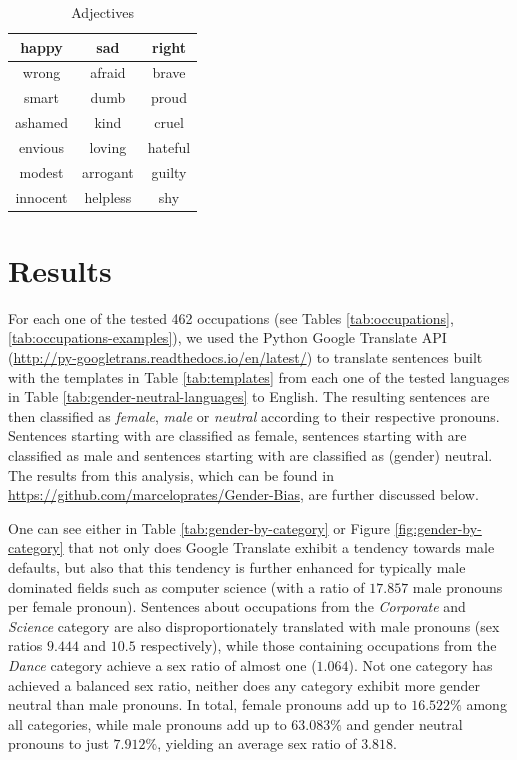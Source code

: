 \documentclass{article}
\begin{document}
\begin{table}[H]
	\centering
	\begin{tabular}{|c|c|c|}
	\hline
	happy 		& sad 		& right 	\\ \hline
	wrong 		& afraid	& brave 	\\ \hline
	smart		& dumb		& proud 	\\ \hline
	ashamed		& kind		& cruel 	\\ \hline
	envious		& loving	& hateful 	\\ \hline
	modest 		& arrogant	& guilty	\\ \hline
	innocent	& helpless	& shy		\\ \hline
	\end{tabular}
	\caption{Adjectives}
	\label{tab:adjectives}
\end{table}

\section{Results}

For each one of the tested 462 occupations (see Tables \ref{tab:occupations}, \ref{tab:occupations-examples}), we used the Python Google Translate API (\url{http://py-googletrans.readthedocs.io/en/latest/}) to translate sentences built with the templates in Table \ref{tab:templates} from each one of the tested languages in Table \ref{tab:gender-neutral-languages} to English. The resulting sentences are then classified as \emph{female}, \emph{male} or \emph{neutral} according to their respective pronouns. Sentences starting with  are classified as female, sentences starting with  are classified as male and sentences starting with  are classified as (gender) neutral. The results from this analysis, which can be found in \url{https://github.com/marceloprates/Gender-Bias}, are further discussed below.

One can see either in Table \ref{tab:gender-by-category} or Figure \ref{fig:gender-by-category} that not only does Google Translate exhibit a tendency towards male defaults, but also that this tendency is further enhanced for typically male dominated fields such as computer science (with a ratio of $17.857$ male pronouns per female pronoun). Sentences about occupations from the \emph{Corporate} and \emph{Science} category are also disproportionately translated with male pronouns (sex ratios $9.444$ and $10.5$ respectively), while those containing occupations from the \emph{Dance} category achieve a sex ratio of almost one ($1.064$). Not one category has achieved a balanced sex ratio, neither does any category exhibit more gender neutral than male pronouns. In total, female pronouns add up to $16.522\%$ among all categories, while male pronouns add up to $63.083\%$ and gender neutral pronouns to just $7.912\%$, yielding an average sex ratio of $3.818$.
\end{document}
